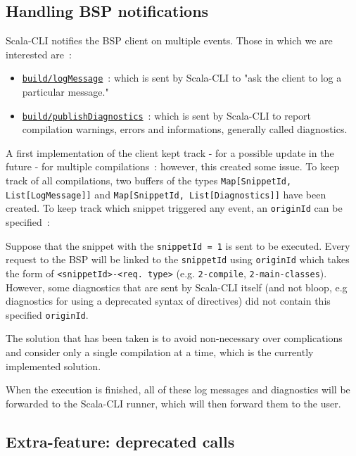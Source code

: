 \documentclass{article}
\begin{document}
\subsection{Handling BSP notifications}

Scala-CLI notifies the BSP client on multiple events. Those in which we are interested are~:

\begin{itemize}
    \item \href{https://build-server-protocol.github.io/docs/specification#log-message}{\lstinline{build/logMessage}}~: which is sent by Scala-CLI to "ask the client to log a particular message."
    \item \href{https://build-server-protocol.github.io/docs/specification#publish-diagnostics}{\lstinline{build/publishDiagnostics}}~: which is sent by Scala-CLI to report compilation warnings, errors and informations, generally called diagnostics.
\end{itemize}

A first implementation of the client kept track - for a possible update in the future - for multiple compilations~: however, this created some issue. To keep track of all compilations, two buffers of the types \lstinline{Map[SnippetId, List[LogMessage]]} and \lstinline{Map[SnippetId, List[Diagnostics]]} have been created. To keep track which snippet triggered any event, an \lstinline{originId} can be specified~:

Suppose that the snippet with the \lstinline{snippetId = 1} is sent to be executed. Every request to the BSP will be linked to the \lstinline{snippetId} using \lstinline{originId} which takes the form of \lstinline{<snippetId>-<req. type>} (e.g. \lstinline{2-compile}, \lstinline{2-main-classes}). However, some diagnostics that are sent by Scala-CLI itself (and not bloop, e.g diagnostics for using a deprecated syntax of directives) did not contain this specified \lstinline{originId}.

The solution that has been taken is to avoid non-necessary over complications and consider only a single compilation at a time, which is the currently implemented solution.

When the execution is finished, all of these log messages and diagnostics will be forwarded to the Scala-CLI runner, which will then forward them to the user.

\subsection{Extra-feature: deprecated calls}
\end{document}
